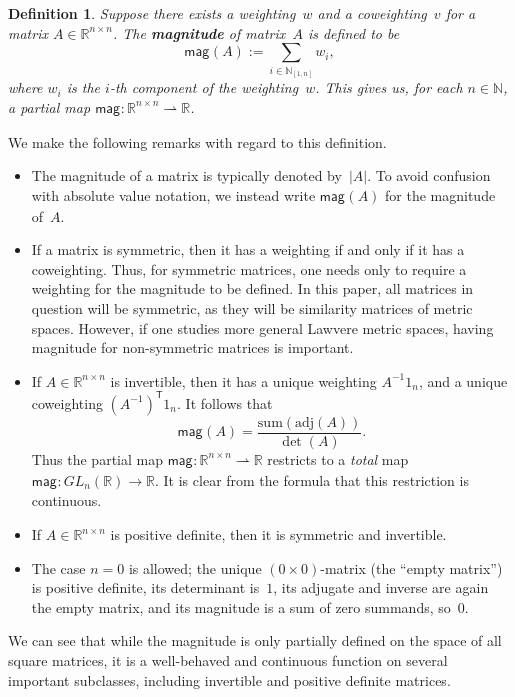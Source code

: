 \documentclass[11pt]{article}
\theoremstyle{plain}
\newtheorem{definition}[theorem]{Definition}
\theoremstyle{definition}
\newcommand{\df}[1]{\emph{\textbf{#1}}}  %
\newcommand{\NN}{\mathbb{N}}
\newcommand{\RR}{\mathbb{R}}
\newcommand{\intcc}[3][\RR]{{#1}_{[#2, #3]}}
\newcommand{\parto}{\mathrel{\rightharpoonup}}  %
\newcommand{\transpose}{{\mathsf{T}}}
\newcommand{\mg}[1][]{\mathsf{mag}_{#1}}
\newcommand{\adj}{\mathrm{adj}}
\newcommand{\pdm}[1]{\mathrm{PDM}_{#1}}
\begin{document}
\begin{definition}
Suppose there exists a weighting~$w$ and a coweighting~$v$ for a matrix $A \in \RR^{n \times n}$. The \df{magnitude} of matrix~$A$ is defined to be
\[\mg(A) := \sum_{i \in \intcc[\NN]{1}{n}} w_i,\]
where $w_i$ is the $i$-th component of the weighting~$w$. This gives us, for each $n \in \NN$, a partial map $\mg \colon \RR^{n \times n} \parto \RR$.
\end{definition}

We make the following remarks with regard to this definition.

\begin{itemize}
\item
The magnitude of a matrix is typically denoted by~$|A|$. To avoid confusion with absolute value notation, we instead write $\mg(A)$ for the magnitude of~$A$.
\item
If a matrix is symmetric, then it has a weighting if and only if it has a coweighting. Thus, for symmetric matrices, one needs only to require a weighting for the magnitude to be defined. In this paper, all matrices in question will be symmetric, as they will be similarity matrices of metric spaces. However, if one studies more general Lawvere metric spaces, having magnitude for non-symmetric matrices is important.
\item
If $A \in \RR^{n \times n}$ is invertible, then it has a unique weighting $A^{-1} 1_n$, and a unique coweighting $(A^{-1})^\transpose 1_n$. It follows that
\[\mg(A) = \frac{\mathrm{sum}(\adj(A))}{\det(A)}.\]
Thus the partial map $\mg\colon \RR^{n \times n} \parto \RR$ restricts to a \emph{total} map $\mg \colon GL_n(\RR) \to \RR$. It is clear from the formula that this restriction is continuous.
\item
If $A \in \RR^{n \times n}$ is positive definite, then it is symmetric and invertible. 
\item
The case $n = 0$ is allowed; the unique $(0 \times 0)$-matrix (the ``empty matrix'') is positive definite, its determinant is~$1$, its adjugate and inverse are again the empty matrix, and its magnitude is a sum of zero summands, so~$0$.
\end{itemize}

We can see that while the magnitude is only partially defined on the space of all square matrices, it is a well-behaved and continuous function on several important subclasses, including invertible and positive definite matrices. 
\end{document}

